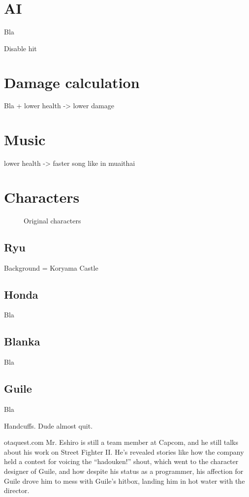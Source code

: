 \section{AI}
Bla

Disable hit

\section{Damage calculation}
Bla + lower health -> lower damage

\section{Music}
lower health -> faster song like in muaithai

\section{Characters}

\begin{figure}[H]
\caption*{Original characters}
\end{figure}


\subsection{Ryu} 
Background = Koryama Castle
\subsection{Honda} Bla
\subsection{Blanka} Bla
\subsection{Guile} Bla

Handcuffs. Dude almost quit. 

\begin{q}{otaquest.com\cite{otaquest}}
Mr. Eshiro is still a team member at Capcom, and he still talks about his work on Street Fighter II. He’s revealed stories like how the company held a contest for voicing the “hadouken!” shout, which went to the character designer of Guile, and how despite his status as a programmer, his affection for Guile drove him to mess with Guile’s hitbox, landing him in hot water with the director.
\end{q}

